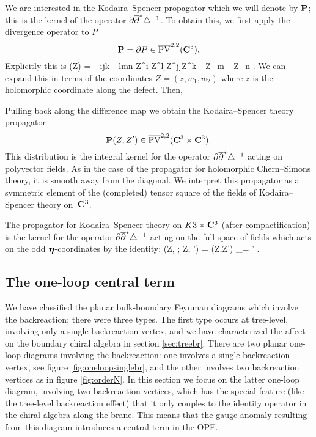 \documentclass[../main.tex]{subfiles}
\begin{document}
We are interested in the Kodaira--Spencer propagator which we will denote by $\bf P$; this is the kernel of the operator $\partial \overline{\partial}^* \triangle^{-1}$. 
To obtain this, we first apply the divergence operator to $P$ 
\[
\mathbf{P} = \partial P \in \overline{{\rm PV}}^{2,2}(\mathbf{C}^3) .
\]
Explicitly this is
\beqn
\bP (Z) =  \ep_{ijk} \ep_{lmn} \br Z^{i} \br Z^l \d \br Z^j \d \br Z^k \del_{Z_m} \del_{Z_n} .
\eeqn
We can expand this in terms of the coordinates $Z = (z,w_1,w_2)$ where $z$ is the holomorphic coordinate along the defect.
Then, 

Pulling back along the difference map we obtain the Kodaira--Spencer theory propagator
\[
\mathbf{P} (Z,Z') \in \overline{{\rm PV}}^{2,2}(\mathbf{C}^3 \times \mathbf{C}^3) .
\]
This distribution is the integral kernel for the operator $\partial \overline{\partial}^* \triangle^{-1}$ acting on polyvector fields. 
As in the case of the propagator for holomorphic Chern--Simons theory, it is smooth away from the diagonal. 
We interpret this propagator as a symmetric element of the (completed) tensor square of the fields of Kodaira--Spencer theory on~$\mathbf{C}^3$. 

The propagator for Kodaira--Spencer theory on $K3 \times \mathbf{C}^3$ (after compactification) is the kernel for the operator $\partial \overline{\partial}^* \triangle^{-1}$ acting on the full space of fields which acts on the odd $\boldsymbol\eta$-coordinates by the identity:
\beqn
\bP(Z, \bfeta ; Z, \bfeta') = \bP(Z,Z') \delta_{\bfeta = \bfeta'} .
\eeqn

\subsection{The one-loop central term} 
\label{sec:oneloop}

We have classified the planar bulk-boundary Feynman diagrams which involve the backreaction; there were three types.
The first type occurs at tree-level, involving only a single backreaction vertex, and we have characterized the affect on the boundary chiral algebra in section \ref{sec:treebr}.
There are two planar one-loop diagrams involving the backreaction: one involves a single backreaction vertex, see figure \ref{fig:oneloopsinglebr}, and the other involves two backreaction vertices as in figure \ref{fig:orderN}.
In this section we focus on the latter one-loop diagram, involving two backreaction vertices, which has the special feature (like the tree-level backreaction effect) that it only couples to the identity operator in the chiral algebra along the brane. This means that the gauge anomaly resulting from this diagram introduces a central term in the OPE.
\end{document}
